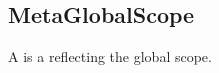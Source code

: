 \subsection{MetaGlobalScope}
\label{concept-MetaGlobalScope}

A  is a  reflecting the global scope.



